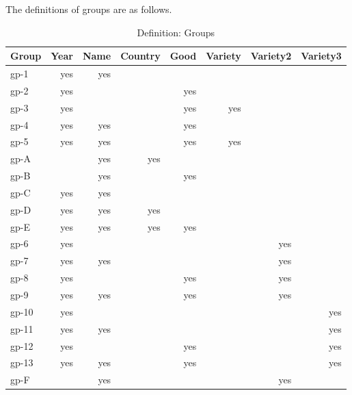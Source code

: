 The definitions of groups are as follows.

\begin{table}[H]
	\caption{Definition: Groups}\label{tbl0}
	\begin{tabular}{l|rrrrrrr}
		\hline\hline
		Group & Year & Name & Country & Good & Variety & Variety2 & Variety3 \\ \hline\hline
		gp-1  &  yes &  yes &         &      &         &          &          \\
		gp-2  &  yes &      &         &  yes &         &          &          \\
		gp-3  &  yes &      &         &  yes &     yes &          &          \\
		gp-4  &  yes &  yes &         &  yes &         &          &          \\
		gp-5  &  yes &  yes &         &  yes &     yes &          &          \\ \hline\hline
		gp-A  &      &  yes &     yes &      &         &          &          \\
		gp-B  &      &  yes &         &  yes &         &          &          \\
		gp-C  &  yes &  yes &         &      &         &          &          \\
		gp-D  &  yes &  yes &     yes &      &         &          &          \\
		gp-E  &  yes &  yes &     yes &  yes &         &          &          \\ \hline\hline
		gp-6  &  yes &      &         &      &         &      yes &          \\
		gp-7  &  yes &  yes &         &      &         &      yes &          \\
		gp-8  &  yes &      &         &  yes &         &      yes &          \\
		gp-9  &  yes &  yes &         &  yes &         &      yes &          \\ \hline
		gp-10 &  yes &      &         &      &         &          &      yes \\
		gp-11 &  yes &  yes &         &      &         &          &      yes \\
		gp-12 &  yes &      &         &  yes &         &          &      yes \\
		gp-13 &  yes &  yes &         &  yes &         &          &      yes \\ \hline\hline
		gp-F  &      &  yes &         &      &         &      yes &          \\

\end{tabular}
\end{table}
